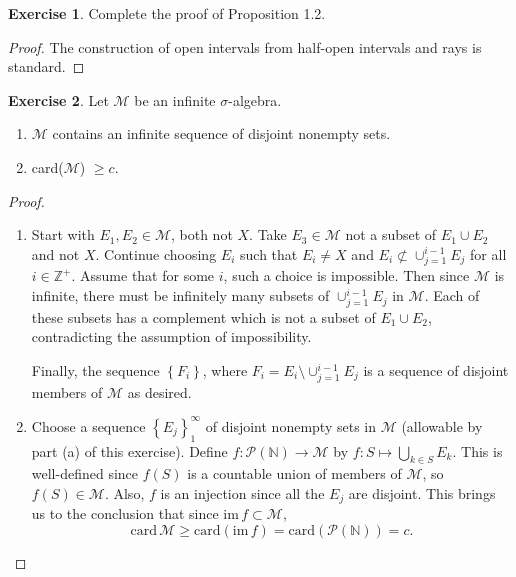 \documentclass{article}
\theoremstyle{definition}
\newtheorem{ex}{Exercise}
\begin{document}
\begin{ex}
	Complete the proof of Proposition 1.2.
\end{ex}
\begin{proof}
	The construction of open intervals from half-open intervals and rays is standard.
\end{proof}

\begin{ex}
	Let $\mathscr{M}$ be an infinite $\sigma$-algebra.
	\begin{enumerate}[label=\textbf{\alph*.}]
		\item $\mathscr{M}$ contains an infinite sequence of disjoint nonempty sets.
		\item card($\mathscr{M}$) $\geq c$.
	\end{enumerate}
\end{ex}
\begin{proof}
	\ \begin{enumerate}[label=\textbf{\alph*.}]
    \item Start with $E_1, E_2 \in \mathscr{M}$, both not $X$.
      Take $E_3 \in \mathscr{M}$ not a subset of $E_1 \cup E_2$ and not $X$.
      Continue choosing $E_i$ such that $E_i \neq X$ and $E_i \not\subset \cup_{j = 1}^{i -1} E_j$ for all $i \in \mathbb{Z}^+$.
      Assume that for some $i$, such a choice is impossible.
      Then since $\mathscr{M}$ is infinite, there must be infinitely many subsets of $\cup_{j = 1}^{i-1}E_j$ in $\mathscr{M}$.
      Each of these subsets has a complement which is not a subset of $E_1 \cup E_2$, contradicting the assumption of impossibility.

      Finally, the sequence $\left\lbrace F_i \right\rbrace$, where $F_i = E_i \setminus \cup_{j = 1}^{i -1}E_j$ is a sequence of disjoint members of $\mathscr{M}$ as desired.
		\item Choose a sequence $\left\lbrace E_j \right\rbrace _{1}^{\infty}$ of disjoint nonempty sets in $\mathscr{M}$ (allowable by part (a) of this exercise).
		      Define $f: \mathscr{P}(\mathbb{N}) \to \mathscr{M}$ by $f: S \mapsto \bigcup_{k \in S} E_k$.
		      This is well-defined since $f(S)$ is a countable union of members of $\mathscr{M}$, so $f(S) \in \mathscr{M}$.
		      Also, $f$ is an injection since all the $E_j$ are disjoint.
		      This brings us to the conclusion that since $\mathrm{im }\,f \subset \mathscr{M}$, \begin{equation*}
			      \mathrm{card}\, \mathscr{M} \geq \mathrm{card}(\mathrm{im }\,f) = \mathrm{card}(\mathscr{P}(\mathbb{N})) = c.
		      \end{equation*}
	\end{enumerate}
\end{proof}
\end{document}
